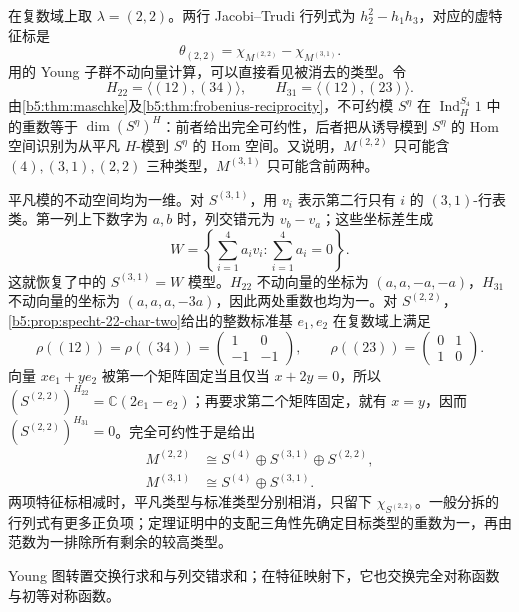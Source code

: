 \begin{example}\label{b5:exm:frobenius-cancellation-22}
	在复数域上取 \(\lambda=(2,2)\)。两行 Jacobi--Trudi 行列式为 \(h_2^2-h_1h_3\)，对应的虚特征标是
	\[
		\theta_{(2,2)}=\chi_{M^{(2,2)}}-\chi_{M^{(3,1)}}.
	\]
	用的 Young 子群不动向量计算，可以直接看见被消去的类型。令
	\[
		H_{22}=\langle(12),(34)\rangle,\qquad H_{31}=\langle(12),(23)\rangle.
	\]
	由\cref{b5:thm:maschke}及\cref{b5:thm:frobenius-reciprocity}，不可约模 \(S^\eta\) 在 \(\operatorname{Ind}_H^{S_4}1\) 中的重数等于 \(\dim(S^\eta)^H\)：前者给出完全可约性，后者把从诱导模到 \(S^\eta\) 的 Hom 空间识别为从平凡 \(H\)-模到 \(S^\eta\) 的 Hom 空间。又说明，\(M^{(2,2)}\) 只可能含 \((4),(3,1),(2,2)\) 三种类型，\(M^{(3,1)}\) 只可能含前两种。

	平凡模的不动空间均为一维。对 \(S^{(3,1)}\)，用 \(v_i\) 表示第二行只有 \(i\) 的 \((3,1)\)-行表类。第一列上下数字为 \(a,b\) 时，列交错元为 \(v_b-v_a\)；这些坐标差生成
	\[
		W=\left\{\sum_{i=1}^4a_i v_i:\sum_{i=1}^4a_i=0\right\}.
	\]
	这就恢复了中的 \(S^{(3,1)}=W\) 模型。\(H_{22}\) 不动向量的坐标为 \((a,a,-a,-a)\)，\(H_{31}\) 不动向量的坐标为 \((a,a,a,-3a)\)，因此两处重数也均为一。对 \(S^{(2,2)}\)，\cref{b5:prop:specht-22-char-two}给出的整数标准基 \(e_1,e_2\) 在复数域上满足
	\[
		\rho((12))=\rho((34))=\begin{pmatrix}1&0\\-1&-1\end{pmatrix},\qquad
		\rho((23))=\begin{pmatrix}0&1\\1&0\end{pmatrix}.
	\]
	向量 \(xe_1+ye_2\) 被第一个矩阵固定当且仅当 \(x+2y=0\)，所以 \((S^{(2,2)})^{H_{22}}=\mathbb C(2e_1-e_2)\)；再要求第二个矩阵固定，就有 \(x=y\)，因而 \((S^{(2,2)})^{H_{31}}=0\)。完全可约性于是给出
	\[
		\begin{aligned}
			M^{(2,2)}&\cong S^{(4)}\oplus S^{(3,1)}\oplus S^{(2,2)},\\
			M^{(3,1)}&\cong S^{(4)}\oplus S^{(3,1)}.
		\end{aligned}
	\]
	两项特征标相减时，平凡类型与标准类型分别相消，只留下 \(\chi_{S^{(2,2)}}\)。一般分拆的行列式有更多正负项；定理证明中的支配三角性先确定目标类型的重数为一，再由范数为一排除所有剩余的较高类型。
\end{example}

Young 图转置交换行求和与列交错求和；在特征映射下，它也交换完全对称函数与初等对称函数。

